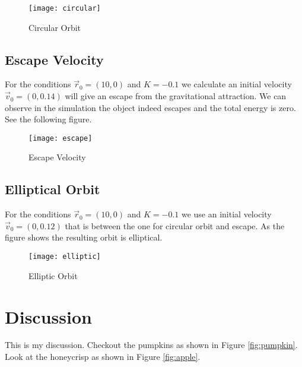 \documentclass{article}
\begin{document}
\begin{figure}[h]
\begin{center}
\texttt{[image: circular]} %
\caption{Circular Orbit}
\end{center}
\end{figure}

\subsection{Escape Velocity}
For the conditions $\overrightarrow{r}_0=(10,0)$ and $K=-0.1$ we calculate an initial velocity $\overrightarrow{v}_0=(0,0.14)$ will give an escape from the gravitational attraction.  We can observe in the simulation the object indeed escapes and the total energy is zero.  See the following figure.

\begin{figure}[h]
\begin{center}
\texttt{[image: escape]} %
\caption{Escape Velocity}
\end{center}
\end{figure}

\newpage

\subsection{Elliptical Orbit}
For the conditions $\overrightarrow{r}_0=(10,0)$ and $K=-0.1$ we use an initial velocity $\overrightarrow{v}_0=(0,0.12)$ that is between the one for circular orbit and escape.  As the figure shows the resulting orbit is elliptical.

\begin{figure}[h]
\begin{center}
\texttt{[image: elliptic]} %
\caption{Elliptic Orbit}
\end{center}
\end{figure}

\section{Discussion}
This is my discussion.  Checkout the pumpkins as shown in Figure \ref{fig:pumpkin}.  Look at the honeycrisp as shown in Figure \ref{fig:apple}.
\end{document}
